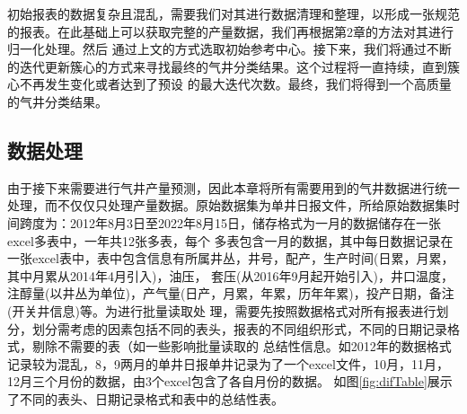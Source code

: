 初始报表的数据复杂且混乱，需要我们对其进行数据清理和整理，以形成一张规范的报表。在此基础上可以获取完整的产量数据，我们再根据第2章的方法对其进行归一化处理。然后
通过上文的方式选取初始参考中心。接下来，我们将通过不断的迭代更新簇心的方式来寻找最终的气井分类结果。这个过程将一直持续，直到簇心不再发生变化或者达到了预设
的最大迭代次数。最终，我们将得到一个高质量的气井分类结果。
\subsection{数据处理}
由于接下来需要进行气井产量预测，因此本章将所有需要用到的气井数据进行统一处理，而不仅仅只处理产量数据。原始数据集为单井日报文件，所给原始数据集时间跨度为：2012年8月3日至2022年8月15日，储存格式为一月的数据储存在一张excel多表中，一年共12张多表，每个
多表包含一月的数据，其中每日数据记录在一张excel表中，表中包含信息有所属井丛，井号，配产，生产时间(日累，月累，其中月累从2014年4月引入)，油压，
套压(从2016年9月起开始引入)，井口温度，注醇量(以井丛为单位)，产气量(日产，月累，年累，历年年累)，投产日期，备注(开关井信息)等。为进行批量读取处
理，需要先按照数据格式对所有报表进行划分，划分需考虑的因素包括不同的表头，报表的不同组织形式，不同的日期记录格式，剔除不需要的表（如一些影响批量读取的
总结性信息。如2012年的数据格式记录较为混乱，8，9两月的单井日报单井记录为了一个excel文件，10月，11月，12月三个月份的数据，由3个excel包含了各自月份的数据。
如图\ref{fig:difTable}展示了不同的表头、日期记录格式和表中的总结性表。

